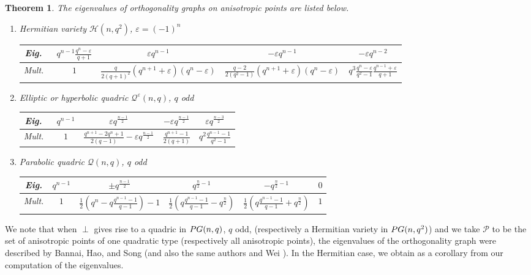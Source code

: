\documentclass[a4paper]{article}
\newtheorem{thm}{Theorem}[section]
\theoremstyle{definition}
\newcommand{\eps}{\varepsilon}
\newcommand{\pg}{\textnormal{PG}}
\newcommand{\pp}{\mathcal P}
\newcommand{\mq}{\mathcal Q}
\newcommand{\mh}{\mathcal H}
\begin{document}
\begin{thm} \label{Thm:EigOrtho}
 The eigenvalues of orthogonality graphs on anisotropic points are listed below.
 \begin{enumerate}
  \item \label{Thm:EigOrtho:Herm} Hermitian variety $\mh(n,q^2)$, $\eps = (-1)^n$
  
  \begin{tabular}{c||c|c|c|c}
     Eig.\ & $q^{n-1} \frac{q^n-\eps}{q+1} $ & $\eps q^{n-1}$ & $-\eps q^{n-1}$ & $-\eps q^{n-2}$ \\ \hline
     Mult.\ & $1$ & $\frac q {2(q+1)^2} \left( q^{n+1}+\eps \right) \left(q^n - \eps \right)$ & $\frac {q-2} {2(q^2-1)} \left( q^{n+1}+\eps \right) \left(q^n - \eps \right)$ & $q^3 \frac{q^n-\eps}{q^2-1} \frac{q^{n-1}+\eps}{q+1}$
  \end{tabular}

  \item \label{Thm:EigOrtho:HypEll} Elliptic or hyperbolic quadric $\mq^\eps(n,q)$, $q$ odd

  \begin{tabular}{c||c|c|c|c}
     Eig.\ & $q^{n-1}$ & $\eps q^\frac{n-1}2$ & $- \eps q^\frac{n-1}2$ & $\eps q^\frac{n-3}2$ \\ \hline
     Mult.\ & $1$ & $\frac{q^{n+1} - 2q^n + 1}{2(q-1)} - \eps q^\frac{n-1}2$
      & $\frac{q^{n+1}-1}{2(q+1)}$ 
      & $q^2 \frac{q^{n-1}-1}{q^2-1}$
  \end{tabular}

  \item \label{Thm:EigOrtho:Par} Parabolic quadric $\mq(n,q)$, $q$ odd

  \begin{tabular}{c||c|c|c|c|c}
     Eig.  & $q^{n-1}$ & $\pm q^\frac{n-1}2$ & $q^{\frac n2 -1}$ & $-q^{\frac n2 - 1}$ & $0$\\ \hline
     Mult.  & $1$ 
     & $\frac 12 \left( q^n - q \frac{q^{n-1}-1}{q-1} \right) - 1$
     & $\frac 12 \left( q \frac{q^{n-1}-1}{q-1} - q^\frac n2 \right)$
     & $\frac 12 \left( q \frac{q^{n-1}-1}{q-1} + q^\frac n2 \right)$
     & $1$
  \end{tabular}
 \end{enumerate}
\end{thm}

We note that when $\perp$ gives rise to a quadric in $\pg(n,q)$, $q$ odd, (respectively a Hermitian variety in $\pg(n,q^2)$) and we take $\pp$ to be the set of anisotropic points of one quadratic type (respectively all anisotropic points), the eigenvalues of the orthogonality graph were described by Bannai, Hao, and Song \cite{bannaihaosong} (and also the same authors and Wei \cite{bannaisonghaowei}).
In the Hermitian case, we obtain  as a corollary from our computation of the eigenvalues.
\end{document}
